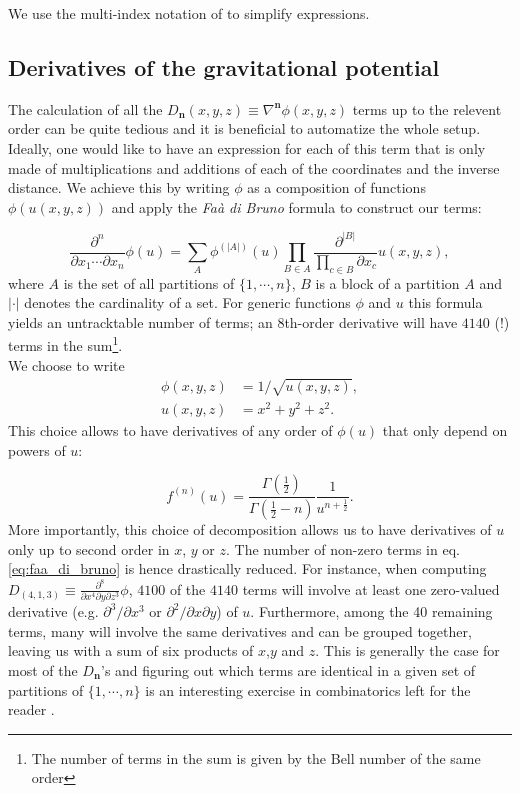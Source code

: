 We use the multi-index notation of \cite{Dehnen2014} to simplify expressions.

\subsection{Derivatives of the gravitational potential}

The calculation of all the
$D_\mathbf{n}(x,y,z) \equiv \nabla^{\mathbf{n}}\phi(x,y,z)$ terms up
to the relevent order can be quite tedious and it is beneficial to
automatize the whole setup. Ideally, one would like to have an
expression for each of this term that is only made of multiplications
and additions of each of the coordinates and the inverse distance. We
achieve this by writing $\phi$ as a composition of functions
$\phi(u(x,y,z))$ and apply the \textit{Fa\`a di Bruno}
formula \citep[i.e. the ``chain rule'' for higher order derivatives,
e.g.][]{Hardy2006} to construct our terms:

\begin{equation}
\label{eq:faa_di_bruno}
\frac{\partial^n}{\partial x_1 \cdots \partial x_n} \phi(u)
= \sum_{A} \phi^{(|A|)}(u) \prod_{B \in
A} \frac{\partial^{|B|}}{\prod_{c\in B}\partial x_c} u(x,y,z),
\end{equation}
where $A$ is the set of all partitions of $\lbrace1,\cdots, n\rbrace$,
$B$ is a block of a partition $A$ and $|\cdot|$ denotes the
cardinality of a set. For generic functions $\phi$ and $u$ this
formula yields an untracktable number of terms; an 8th-order
derivative will have $4140$ (!)  terms in the sum\footnote{The number
of terms in the sum is given by the Bell number of the same order}. \\
We choose to write
\begin{align}
   \phi(x,y,z) &= 1 / \sqrt{u(x,y,z)}, \\
   u(x,y,z) &= x^2 + y^2 + z^2.
\end{align}
This choice allows to have derivatives of any order of $\phi(u)$ that
only depend on powers of $u$:

\begin{equation}
f^{(n)}(u) = \frac{\Gamma(\frac{1}{2})}{\Gamma(\frac{1}{2} -
n)}\frac{1}{u^{n+\frac{1}{2}}}.
\end{equation}
More importantly, this choice of decomposition allows us to have
derivatives of $u$ only up to second order in $x$, $y$ or $z$. The
number of non-zero terms in eq. \ref{eq:faa_di_bruno} is hence
drastically reduced. For instance, when computing
$D_{(4,1,3)} \equiv \frac{\partial^8}{\partial x^4 \partial y \partial
z^3} \phi$, $4100$ of the $4140$ terms will involve at least one
zero-valued derivative (e.g. $\partial^3/\partial x^3$ or
$\partial^2/\partial x\partial y$) of $u$. Furthermore, among the 40
remaining terms, many will involve the same derivatives and can be
grouped together, leaving us with a sum of six products of $x$,$y$ and
$z$. This is generally the case for most of the $D_\mathbf{n}$'s and
figuring out which terms are identical in a given set of partitions of
$\lbrace1,\cdots, n\rbrace$ is an interesting exercise in
combinatorics left for the reader \citep[see also][]{Hardy2006}.

